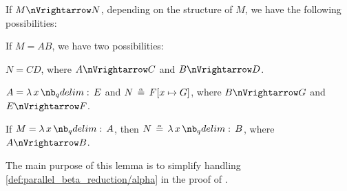 \begin{lemma}\label{thm:parallel_beta_reduction_deconstruction}
  If \( M \pred N \), depending on the structure of \( M \), we have the following possibilities:
  \begin{thmenum}
     If \( M = AB \), we have two possibilities:
    \begin{thmenum}
       \( N = CD \), where \( A \pred C \) and \( B \pred D \).

       \( A = \qabs x E \) and \( N \aequiv F[x \mapsto G] \), where \( B \pred G \) and \( E \pred F \).
    \end{thmenum}

     If \( M = \qabs x A \), then \( N \aequiv \qabs x B \), where \( A \pred B \).
  \end{thmenum}
\end{lemma}
\begin{comments}
  \item The main purpose of this lemma is to simplify handling \ref{def:parallel_beta_reduction/alpha} in the proof of .
\end{comments}
